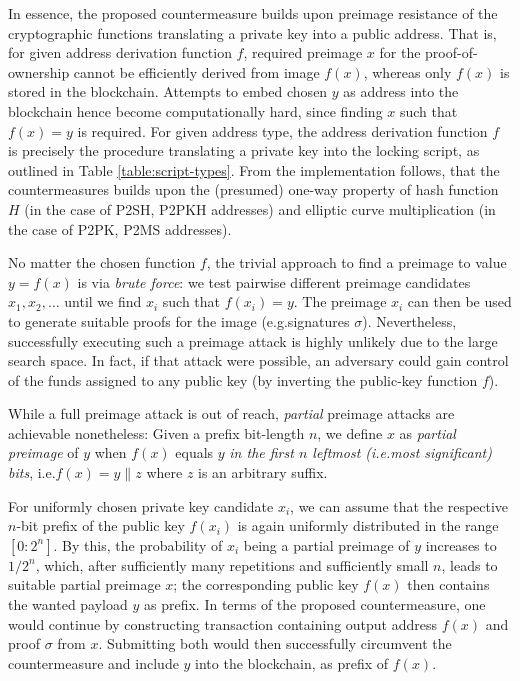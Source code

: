 \documentclass[a4paper,11pt,titlepage]{scrbook}
\begin{document}
In essence, the proposed countermeasure builds upon preimage resistance of the cryptographic functions translating a private key into a public address.
That is, for given address derivation function $f$, required preimage $x$ for the proof-of-ownership cannot be efficiently derived from image $f(x)$, whereas only $f(x)$ is stored in the blockchain.
Attempts to embed chosen $y$ as address into the blockchain hence become computationally hard, since finding $x$ such that $f(x)=y$ is required.
For given address type, the address derivation function $f$ is precisely the procedure translating a private key into the locking script, as outlined in Table \ref{table:script-types}.
From the implementation follows, that the countermeasures builds upon the (presumed) one-way property of hash function $H$ (in the case of P2SH, P2PKH addresses) and elliptic curve multiplication (in the case of P2PK, P2MS addresses).

No matter the chosen function $f$, the trivial approach to find a preimage to value $y=f(x)$ is via \emph{brute force}: we test pairwise different preimage candidates $x_1, x_2, \dots$ until we find $x_i$ such that $f(x_i)=y$.
The preimage $x_i$ can then be used to generate suitable proofs for the image (e.g.\@ signatures $\sigma$).
Nevertheless, successfully executing such a preimage attack is highly unlikely due to the large search space.
In fact, if that attack were possible, an adversary could gain control of the funds assigned to any public key (by inverting the public-key function $f$).

While a full preimage attack is out of reach, \emph{partial} preimage attacks are achievable nonetheless:
Given a prefix bit-length $n$, we define $x$ as \emph{partial preimage} of $y$ when $f(x)$ equals $y$ \emph{in the first $n$ leftmost (i.e.\@ most significant) bits}, i.e.\@ $f(x)=y\|z$ where $z$ is an arbitrary suffix.

For uniformly chosen private key candidate $x_i$, we can assume that the respective $n$-bit prefix of the public key $f(x_i)$ is again uniformly distributed in the range $[0{:}2^n]$.
By this, the probability of $x_i$ being a partial preimage of $y$ increases to $1/2^n$, which, after sufficiently many repetitions and sufficiently small $n$, leads to suitable partial preimage $x$; the corresponding public key $f(x)$ then contains the wanted payload $y$ as prefix.
In terms of the proposed countermeasure, one would continue by constructing transaction containing output address $f(x)$ and proof $\sigma$ from $x$.
Submitting both would then successfully circumvent the countermeasure and include $y$ into the blockchain, as prefix of $f(x)$.
\end{document}
